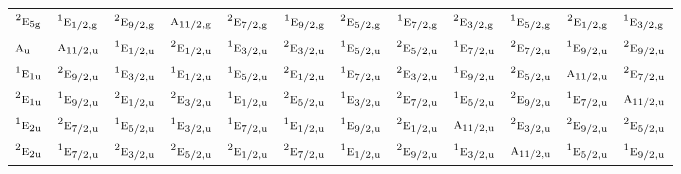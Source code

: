 \documentclass[10pt,a4paper]{article}
\numberwithin{equation}{section}
\newcommand{\irr}[1]{\text{\normalfont\scshape #1}}
\newcommand{\conjpair}[1]{{}^{#1}}
\newcommand{\ptag}[1]{\mathrm{#1}}
\begin{document}
{\begin{longtable}{@{}lccccccccccc@{}}
$\conjpair{2}\irr{e}_{5\ptag{g}}$ & $\conjpair{1}\irr{e}_{1/2,\ptag{g}}$ & $\conjpair{2}\irr{e}_{9/2,\ptag{g}}$ & $\irr{a}_{11/2,\ptag{g}}$ & $\conjpair{2}\irr{e}_{7/2,\ptag{g}}$ & $\conjpair{1}\irr{e}_{9/2,\ptag{g}}$ & $\conjpair{2}\irr{e}_{5/2,\ptag{g}}$ & $\conjpair{1}\irr{e}_{7/2,\ptag{g}}$ & $\conjpair{2}\irr{e}_{3/2,\ptag{g}}$ & $\conjpair{1}\irr{e}_{5/2,\ptag{g}}$ & $\conjpair{2}\irr{e}_{1/2,\ptag{g}}$ & $\conjpair{1}\irr{e}_{3/2,\ptag{g}}$\\
$\irr{a}_{\ptag{u}}$ & $\irr{a}_{11/2,\ptag{u}}$ & $\conjpair{1}\irr{e}_{1/2,\ptag{u}}$ & $\conjpair{2}\irr{e}_{1/2,\ptag{u}}$ & $\conjpair{1}\irr{e}_{3/2,\ptag{u}}$ & $\conjpair{2}\irr{e}_{3/2,\ptag{u}}$ & $\conjpair{1}\irr{e}_{5/2,\ptag{u}}$ & $\conjpair{2}\irr{e}_{5/2,\ptag{u}}$ & $\conjpair{1}\irr{e}_{7/2,\ptag{u}}$ & $\conjpair{2}\irr{e}_{7/2,\ptag{u}}$ & $\conjpair{1}\irr{e}_{9/2,\ptag{u}}$ & $\conjpair{2}\irr{e}_{9/2,\ptag{u}}$\\
$\conjpair{1}\irr{e}_{1\ptag{u}}$ & $\conjpair{2}\irr{e}_{9/2,\ptag{u}}$ & $\conjpair{1}\irr{e}_{3/2,\ptag{u}}$ & $\conjpair{1}\irr{e}_{1/2,\ptag{u}}$ & $\conjpair{1}\irr{e}_{5/2,\ptag{u}}$ & $\conjpair{2}\irr{e}_{1/2,\ptag{u}}$ & $\conjpair{1}\irr{e}_{7/2,\ptag{u}}$ & $\conjpair{2}\irr{e}_{3/2,\ptag{u}}$ & $\conjpair{1}\irr{e}_{9/2,\ptag{u}}$ & $\conjpair{2}\irr{e}_{5/2,\ptag{u}}$ & $\irr{a}_{11/2,\ptag{u}}$ & $\conjpair{2}\irr{e}_{7/2,\ptag{u}}$\\
$\conjpair{2}\irr{e}_{1\ptag{u}}$ & $\conjpair{1}\irr{e}_{9/2,\ptag{u}}$ & $\conjpair{2}\irr{e}_{1/2,\ptag{u}}$ & $\conjpair{2}\irr{e}_{3/2,\ptag{u}}$ & $\conjpair{1}\irr{e}_{1/2,\ptag{u}}$ & $\conjpair{2}\irr{e}_{5/2,\ptag{u}}$ & $\conjpair{1}\irr{e}_{3/2,\ptag{u}}$ & $\conjpair{2}\irr{e}_{7/2,\ptag{u}}$ & $\conjpair{1}\irr{e}_{5/2,\ptag{u}}$ & $\conjpair{2}\irr{e}_{9/2,\ptag{u}}$ & $\conjpair{1}\irr{e}_{7/2,\ptag{u}}$ & $\irr{a}_{11/2,\ptag{u}}$\\
$\conjpair{1}\irr{e}_{2\ptag{u}}$ & $\conjpair{2}\irr{e}_{7/2,\ptag{u}}$ & $\conjpair{1}\irr{e}_{5/2,\ptag{u}}$ & $\conjpair{1}\irr{e}_{3/2,\ptag{u}}$ & $\conjpair{1}\irr{e}_{7/2,\ptag{u}}$ & $\conjpair{1}\irr{e}_{1/2,\ptag{u}}$ & $\conjpair{1}\irr{e}_{9/2,\ptag{u}}$ & $\conjpair{2}\irr{e}_{1/2,\ptag{u}}$ & $\irr{a}_{11/2,\ptag{u}}$ & $\conjpair{2}\irr{e}_{3/2,\ptag{u}}$ & $\conjpair{2}\irr{e}_{9/2,\ptag{u}}$ & $\conjpair{2}\irr{e}_{5/2,\ptag{u}}$\\
$\conjpair{2}\irr{e}_{2\ptag{u}}$ & $\conjpair{1}\irr{e}_{7/2,\ptag{u}}$ & $\conjpair{2}\irr{e}_{3/2,\ptag{u}}$ & $\conjpair{2}\irr{e}_{5/2,\ptag{u}}$ & $\conjpair{2}\irr{e}_{1/2,\ptag{u}}$ & $\conjpair{2}\irr{e}_{7/2,\ptag{u}}$ & $\conjpair{1}\irr{e}_{1/2,\ptag{u}}$ & $\conjpair{2}\irr{e}_{9/2,\ptag{u}}$ & $\conjpair{1}\irr{e}_{3/2,\ptag{u}}$ & $\irr{a}_{11/2,\ptag{u}}$ & $\conjpair{1}\irr{e}_{5/2,\ptag{u}}$ & $\conjpair{1}\irr{e}_{9/2,\ptag{u}}$\\

\end{longtable}}
\end{document}
